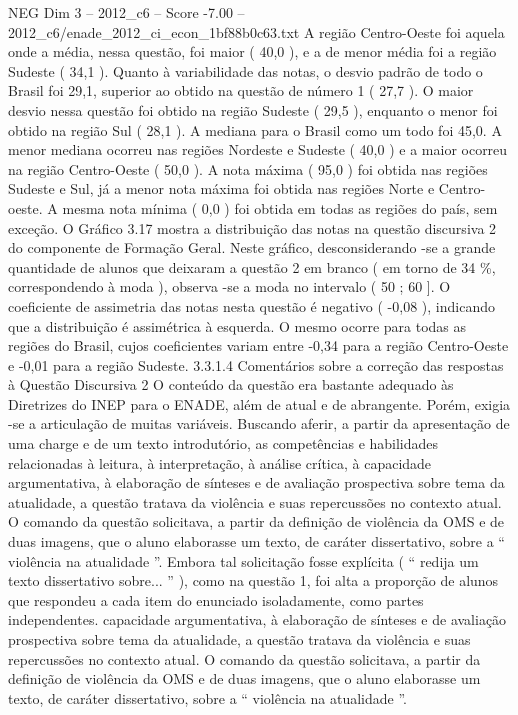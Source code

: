 \begin{textsample}{NEG Dim 3 – 2012\_c6 – Score -7.00 – 2012\_c6/enade\_2012\_ci\_econ\_1bf88b0c63.txt}
A região Centro-Oeste foi aquela onde a média, nessa questão, foi maior ( 40,0 ), e a de menor média foi a região Sudeste ( 34,1 ).
Quanto à variabilidade das notas, o desvio padrão de todo o Brasil foi 29,1, superior ao obtido na questão de número 1 ( 27,7 ).
O maior desvio nessa questão foi obtido na região Sudeste ( 29,5 ), enquanto o menor foi obtido na região Sul ( 28,1 ).
A mediana para o Brasil como um todo foi 45,0.
A menor mediana ocorreu nas regiões Nordeste e Sudeste ( 40,0 ) e a maior ocorreu na região Centro-Oeste ( 50,0 ).
A nota máxima ( 95,0 ) foi obtida nas regiões Sudeste e Sul, já a menor nota máxima foi obtida nas regiões Norte e Centro-oeste.
A mesma nota mínima ( 0,0 ) foi obtida em todas as regiões do país, sem exceção.
O Gráfico 3.17 mostra a distribuição das notas na questão discursiva 2 do componente de Formação Geral.
Neste gráfico, desconsiderando -se a grande quantidade de alunos que deixaram a questão 2 em branco ( em torno de 34 \%, correspondendo à moda ), observa -se a moda no intervalo ( 50 ; 60 ].
O coeficiente de assimetria das notas nesta questão é negativo ( -0,08 ), indicando que a distribuição é assimétrica à esquerda.
O mesmo ocorre para todas as regiões do Brasil, cujos coeficientes variam entre -0,34 para a região Centro-Oeste e -0,01 para a região Sudeste. 3.3.1.4 Comentários sobre a correção das respostas à Questão Discursiva 2 O conteúdo da questão era bastante adequado às Diretrizes do INEP para o ENADE, além de atual e de abrangente.
Porém, exigia -se a articulação de muitas variáveis.
Buscando aferir, a partir da apresentação de uma charge e de um texto introdutório, as competências e habilidades relacionadas à leitura, à interpretação, à análise crítica, à capacidade argumentativa, à elaboração de sínteses e de avaliação prospectiva sobre tema da atualidade, a questão tratava da violência e suas repercussões no contexto atual.
O comando da questão solicitava, a partir da definição de violência da OMS e de duas imagens, que o aluno elaborasse um texto, de caráter dissertativo, sobre a “ violência na atualidade ”.
Embora tal solicitação fosse explícita ( “ redija um texto dissertativo sobre... ” ), como na questão 1, foi alta a proporção de alunos que respondeu a cada item do enunciado isoladamente, como partes independentes. capacidade argumentativa, à elaboração de sínteses e de avaliação prospectiva sobre tema da atualidade, a questão tratava da violência e suas repercussões no contexto atual.
O comando da questão solicitava, a partir da definição de violência da OMS e de duas imagens, que o aluno elaborasse um texto, de caráter dissertativo, sobre a “ violência na atualidade ”.

\end{textsample}
